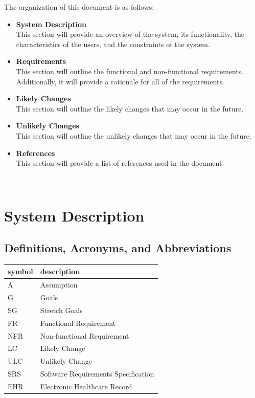 \documentclass[12pt]{article}
\begin{document}
The organization of this document is as follows:
\begin{itemize}
  \item \textbf{System Description}\\
  This section will provide an overview of the system, its functionality, the characteristics of the users, and the constraints of the system.
  \item \textbf{Requirements}\\
  This section will outline the functional and non-functional requirements. Additionally, it will provide a rationale for all of the requirements.
  \item \textbf{Likely Changes}\\
  This section will outline the likely changes that may occur in the future.
  \item \textbf{Unlikely Changes}\\
  This section will outline the unlikely changes that may occur in the future.
  \item \textbf{References}\\
  This section will provide a list of references used in the document.

\end{itemize}

~\newpage

\section{System Description} \label{sec_SystemDescription}

\subsection{Definitions, Acronyms, and Abbreviations} \label{sec_DefinitionsAcronymsAbbreviations}

\begin{tabular}{l l} 
  \toprule    
  \textbf{symbol} & \textbf{description}\\
  \midrule 
  A & Assumption\\
  G & Goals\\
  SG & Stretch Goals\\
  FR & Functional Requirement\\
  NFR & Non-functional Requirement\\
  LC & Likely Change\\
  ULC & Unlikely Change\\
  SRS & Software Requirements Specification\\
  EHR & Electronic Healthcare Record\\
  
  \bottomrule
\end{tabular}\\
\end{document}
